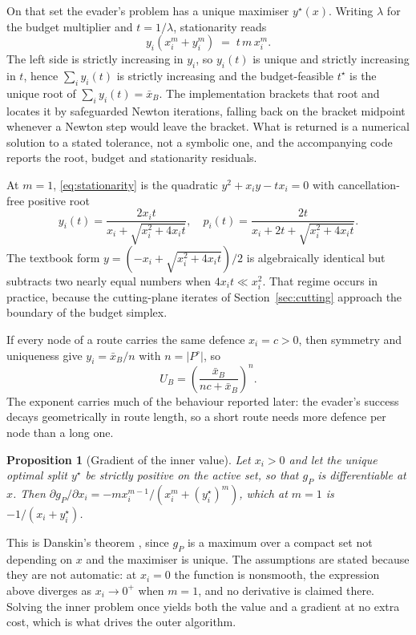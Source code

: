 \documentclass[10pt,a4paper,twoside]{article}
\theoremstyle{plain}
\newtheorem{proposition}[theorem]{Proposition}
\theoremstyle{definition}
\newcommand{\XB}{\bar{x}_B}
\begin{document}
On that set the evader's problem has a unique maximiser $y^{\star}(x)$.
Writing $\lambda$ for the budget multiplier and $t=1/\lambda$, stationarity
reads
\begin{equation}
  y_i(x_i^m+y_i^m) \;=\; t\,m\,x_i^m .
  \label{eq:stationarity}
\end{equation}
The left side is strictly increasing in $y_i$, so $y_i(t)$ is unique and
strictly increasing in $t$, hence $\sum_i y_i(t)$ is strictly increasing and
the budget-feasible $t^{\star}$ is the unique root of
$\sum_i y_i(t)=\XB$. The implementation brackets that root and locates it by
safeguarded Newton iterations, falling back on the bracket midpoint whenever
a Newton step would leave the bracket. What is returned is a numerical
solution to a stated tolerance, not a symbolic one, and the accompanying code
reports the root, budget and stationarity residuals.

At $m=1$, \eqref{eq:stationarity} is the quadratic $y^2+x_iy-tx_i=0$ with
cancellation-free positive root
\begin{equation}
  y_i(t)=\frac{2x_it}{x_i+\sqrt{x_i^2+4x_it}},
  \quad
  p_i(t)=\frac{2t}{x_i+2t+\sqrt{x_i^2+4x_it}} .
  \label{eq:m1-closed}
\end{equation}
The textbook form $y=(-x_i+\sqrt{x_i^2+4x_it})/2$ is algebraically identical
but subtracts two nearly equal numbers when $4x_it\ll x_i^2$. That regime
occurs in practice, because the cutting-plane iterates of
Section~\ref{sec:cutting} approach the boundary of the budget simplex.

If every node of a route carries the same defence $x_i=c>0$, then symmetry
and uniqueness give $y_i=\XB/n$ with $n=|P^{\circ}|$, so
\begin{equation}
  U_B = \left(\frac{\XB}{nc+\XB}\right)^{\!n}.
  \label{eq:symmetric}
\end{equation}
The exponent carries much of the behaviour reported later: the evader's
success decays geometrically in route length, so a short route needs more
defence per node than a long one.

\begin{proposition}[Gradient of the inner value]
\label{prop:danskin}
Let $x_i>0$ and let the unique optimal split $y^{\star}$ be strictly positive
on the active set, so that $g_P$ is differentiable at $x$. Then
$\partial g_P/\partial x_i=-mx_i^{m-1}/(x_i^m+(y_i^{\star})^m)$, which at
$m=1$ is $-1/(x_i+y_i^{\star})$.
\end{proposition}

\noindent This is Danskin's theorem \citep{danskin1967}, since $g_P$ is a
maximum over a compact set not depending on $x$ and the maximiser is unique.
The assumptions are stated because they are not automatic: at $x_i=0$ the
function is nonsmooth, the expression above diverges as $x_i\to0^{+}$ when
$m=1$, and no derivative is claimed there. Solving the inner problem once
yields both the value and a gradient at no extra cost, which is what drives
the outer algorithm.
\end{document}

